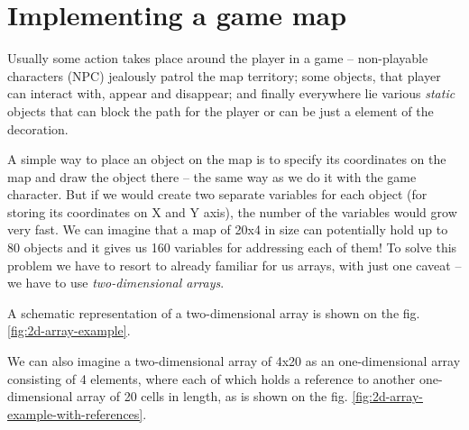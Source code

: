 \documentclass[../sparc.tex]{subfiles}
\begin{document}
\section{Implementing a game map}
\label{section:game-map}

Usually some action takes place around the player in a game -- non-playable
characters (NPC) jealously patrol the map territory; some objects, that player
can interact with, appear and disappear; and finally everywhere lie various
\emph{static} objects that can block the path for the player or can be just a
element of the decoration.

A simple way to place an object on the map is to specify its coordinates on the
map and draw the object there -- the same way as we do it with the game
character.  But if we would create two separate variables for each object (for
storing its coordinates on X and Y axis), the number of the variables would grow
very fast.  We can imagine that a map of 20x4 in size can potentially hold up to
80 objects and it gives us 160 variables for addressing each of them!  To solve
this problem we have to resort to already familiar for us arrays, with just one
caveat -- we have to use \emph{two-dimensional arrays}.

A schematic representation of a two-dimensional array is shown on the
fig. \ref{fig:2d-array-example}.


We can also imagine a two-dimensional array of 4x20 as an one-dimensional array
consisting of 4 elements, where each of which holds a reference to another
one-dimensional array of 20 cells in length, as is shown on the
fig. \ref{fig:2d-array-example-with-references}.

\end{document}
